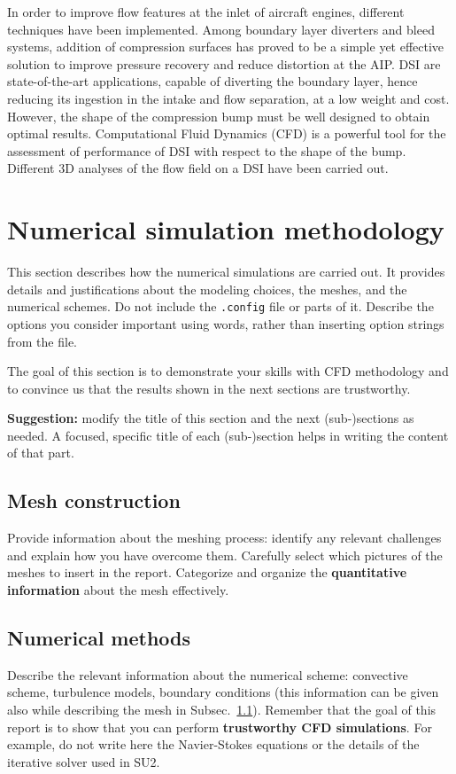 \documentclass[11pt,a4paper]{article}
\begin{document}
 In order to improve flow features at the inlet of aircraft engines, different techniques have been implemented. Among boundary layer diverters and bleed systems, addition of compression surfaces has proved to be a simple yet effective solution to improve pressure recovery and reduce distortion at the AIP. DSI are state-of-the-art applications, capable of diverting the boundary layer, hence reducing its ingestion in the intake and flow separation, at a low weight and cost. However, the shape of the compression bump must be well designed to obtain optimal results. Computational Fluid Dynamics (CFD) is a powerful tool for the assessment of performance of DSI with respect to the shape of the bump. Different 3D analyses of the flow field on a DSI have been carried out.



\section{Numerical simulation methodology}
\label{sec:eqs}
This section describes how the numerical simulations are carried out. It provides details and justifications about the modeling choices, the meshes, and the numerical schemes.
Do not include the \texttt{.config} file or parts of it. Describe the options you consider important using words, rather than inserting option strings from the file.

The goal of this section is to demonstrate your skills with CFD methodology and to convince us that the results shown in the next sections are trustworthy.

\textbf{Suggestion:} modify the title of this section and the next (sub-)sections as needed. A focused, specific title of each (sub-)section helps in writing the content of that part.

\subsection{Mesh construction}\label{sec:mesh}
Provide information about the meshing process: identify any relevant challenges and explain how you have overcome them.
Carefully select which pictures of the meshes to insert in the report.
Categorize and organize the \textbf{quantitative information} about the mesh effectively.

\subsection{Numerical methods}
Describe the relevant information about the numerical scheme: convective scheme, turbulence models, boundary conditions (this information can be given also while describing the mesh in Subsec.~\ref{sec:mesh}).
Remember that the goal of this report is to show that you can perform \textbf{trustworthy CFD simulations}. For example, do not write here the Navier-Stokes equations or the details of the iterative solver used in SU2.
\end{document}
